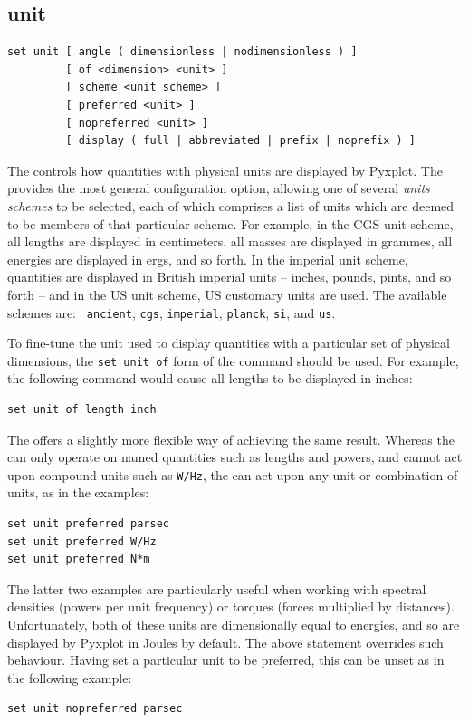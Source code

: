 \subsection{unit}

\begin{verbatim}
set unit [ angle ( dimensionless | nodimensionless ) ]
         [ of <dimension> <unit> ]
         [ scheme <unit scheme> ]
         [ preferred <unit> ]
         [ nopreferred <unit> ]
         [ display ( full | abbreviated | prefix | noprefix ) ]
\end{verbatim}

The  controls how quantities with physical units are
displayed by Pyxplot. The  provides the most general
configuration option, allowing one of several {\it units
schemes} to be selected, each of which comprises a
list of units which are deemed to be members of that particular scheme. For
example, in the CGS unit scheme, all lengths
are displayed in centimeters, all masses are displayed in grammes, all energies
are displayed in ergs, and so forth.  In the imperial unit
scheme, quantities are displayed in
British imperial units -- inches, pounds, pints, and so forth -- and in the US
unit scheme, US customary units are used. The available schemes are: {\tt
ancient}, {\tt cgs}, {\tt imperial}, {\tt planck}, {\tt si}, and {\tt us}.

To fine-tune the unit used to display quantities with a particular set of
physical dimensions, the {\tt set unit of} form of the command should be used.
For example, the following command would cause all lengths to be displayed in
inches:

\begin{verbatim}
set unit of length inch
\end{verbatim}

The  offers a slightly more flexible way of
achieving the same result. Whereas the  can only operate
on named quantities such as lengths and powers, and cannot act upon compound
units such as {\tt W/Hz}, the  can act upon any
unit or combination of units, as in the examples:
\begin{verbatim}
set unit preferred parsec
set unit preferred W/Hz
set unit preferred N*m
\end{verbatim}
The latter two examples are particularly useful when working with spectral
densities (powers per unit frequency) or torques (forces multiplied by
distances). Unfortunately, both of these units are dimensionally equal to
energies, and so are displayed by Pyxplot in Joules by default. The above
statement overrides such behaviour. Having set a particular unit to be
preferred, this can be unset as in the following example:
\begin{verbatim}
set unit nopreferred parsec
\end{verbatim}

